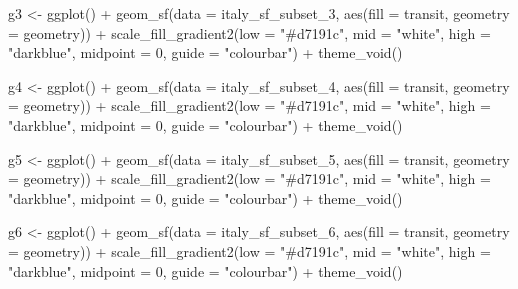 \documentclass[
  letterpaper,
  DIV=11,
  numbers=noendperiod]{scrreprt}
\newenvironment{Shaded}{\begin{snugshade}}{\end{snugshade}}
\newcommand{\AttributeTok}[1]{\textcolor[rgb]{0.40,0.45,0.13}{#1}}
\newcommand{\DecValTok}[1]{\textcolor[rgb]{0.68,0.00,0.00}{#1}}
\newcommand{\FunctionTok}[1]{\textcolor[rgb]{0.28,0.35,0.67}{#1}}
\newcommand{\NormalTok}[1]{\textcolor[rgb]{0.00,0.23,0.31}{#1}}
\newcommand{\OtherTok}[1]{\textcolor[rgb]{0.00,0.23,0.31}{#1}}
\newcommand{\SpecialCharTok}[1]{\textcolor[rgb]{0.37,0.37,0.37}{#1}}
\newcommand{\StringTok}[1]{\textcolor[rgb]{0.13,0.47,0.30}{#1}}
\begin{document}
\begin{Shaded}
\begin{Highlighting}[]
\NormalTok{g3 }\OtherTok{\textless{}{-}} \FunctionTok{ggplot}\NormalTok{() }\SpecialCharTok{+}
  \FunctionTok{geom\_sf}\NormalTok{(}\AttributeTok{data =}\NormalTok{ italy\_sf\_subset\_3, }\FunctionTok{aes}\NormalTok{(}\AttributeTok{fill =}\NormalTok{ transit, }\AttributeTok{geometry =}\NormalTok{ geometry)) }\SpecialCharTok{+}
    \FunctionTok{scale\_fill\_gradient2}\NormalTok{(}\AttributeTok{low =} \StringTok{"\#d7191c"}\NormalTok{, }\AttributeTok{mid =} \StringTok{"white"}\NormalTok{, }\AttributeTok{high =} \StringTok{"darkblue"}\NormalTok{, }
                      \AttributeTok{midpoint =} \DecValTok{0}\NormalTok{, }\AttributeTok{guide =} \StringTok{"colourbar"}\NormalTok{) }\SpecialCharTok{+}
  \FunctionTok{theme\_void}\NormalTok{()}

\NormalTok{g4 }\OtherTok{\textless{}{-}} \FunctionTok{ggplot}\NormalTok{() }\SpecialCharTok{+}
  \FunctionTok{geom\_sf}\NormalTok{(}\AttributeTok{data =}\NormalTok{ italy\_sf\_subset\_4, }\FunctionTok{aes}\NormalTok{(}\AttributeTok{fill =}\NormalTok{ transit, }\AttributeTok{geometry =}\NormalTok{ geometry)) }\SpecialCharTok{+}
    \FunctionTok{scale\_fill\_gradient2}\NormalTok{(}\AttributeTok{low =} \StringTok{"\#d7191c"}\NormalTok{, }\AttributeTok{mid =} \StringTok{"white"}\NormalTok{, }\AttributeTok{high =} \StringTok{"darkblue"}\NormalTok{, }
                      \AttributeTok{midpoint =} \DecValTok{0}\NormalTok{, }\AttributeTok{guide =} \StringTok{"colourbar"}\NormalTok{) }\SpecialCharTok{+}
  \FunctionTok{theme\_void}\NormalTok{()}

\NormalTok{g5 }\OtherTok{\textless{}{-}} \FunctionTok{ggplot}\NormalTok{() }\SpecialCharTok{+}
  \FunctionTok{geom\_sf}\NormalTok{(}\AttributeTok{data =}\NormalTok{ italy\_sf\_subset\_5, }\FunctionTok{aes}\NormalTok{(}\AttributeTok{fill =}\NormalTok{ transit, }\AttributeTok{geometry =}\NormalTok{ geometry)) }\SpecialCharTok{+}
    \FunctionTok{scale\_fill\_gradient2}\NormalTok{(}\AttributeTok{low =} \StringTok{"\#d7191c"}\NormalTok{, }\AttributeTok{mid =} \StringTok{"white"}\NormalTok{, }\AttributeTok{high =} \StringTok{"darkblue"}\NormalTok{, }
                      \AttributeTok{midpoint =} \DecValTok{0}\NormalTok{, }\AttributeTok{guide =} \StringTok{"colourbar"}\NormalTok{) }\SpecialCharTok{+}
  \FunctionTok{theme\_void}\NormalTok{()}

\NormalTok{g6 }\OtherTok{\textless{}{-}} \FunctionTok{ggplot}\NormalTok{() }\SpecialCharTok{+}
  \FunctionTok{geom\_sf}\NormalTok{(}\AttributeTok{data =}\NormalTok{ italy\_sf\_subset\_6, }\FunctionTok{aes}\NormalTok{(}\AttributeTok{fill =}\NormalTok{ transit, }\AttributeTok{geometry =}\NormalTok{ geometry)) }\SpecialCharTok{+}
    \FunctionTok{scale\_fill\_gradient2}\NormalTok{(}\AttributeTok{low =} \StringTok{"\#d7191c"}\NormalTok{, }\AttributeTok{mid =} \StringTok{"white"}\NormalTok{, }\AttributeTok{high =} \StringTok{"darkblue"}\NormalTok{, }
                      \AttributeTok{midpoint =} \DecValTok{0}\NormalTok{, }\AttributeTok{guide =} \StringTok{"colourbar"}\NormalTok{) }\SpecialCharTok{+}
  \FunctionTok{theme\_void}\NormalTok{()}


\end{Highlighting}
\end{Shaded}
\end{document}
